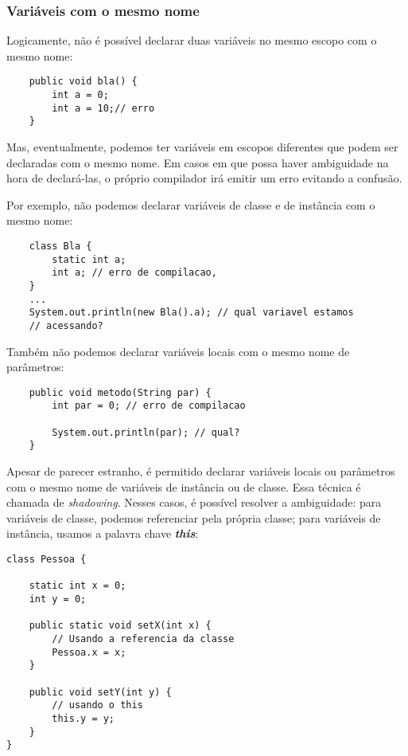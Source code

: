 \documentclass[12pt]{report}
\begin{document}
\subsubsection*{Variáveis com o mesmo nome}

Logicamente, não é possível declarar duas variáveis no mesmo escopo com o mesmo nome:

\begin{lstlisting}
	public void bla() {
		int a = 0;
		int a = 10;// erro
	}
\end{lstlisting}

Mas, eventualmente, podemos ter variáveis em escopos diferentes que podem ser declaradas com o mesmo nome. Em casos em que possa haver ambiguidade na hora de declará-las, o próprio compilador irá emitir um erro evitando a confusão.
\pagebreak

Por exemplo, não podemos declarar variáveis de classe e de instância com o mesmo nome:

\begin{lstlisting}
	class Bla {
		static int a;
		int a; // erro de compilacao,
	}
	...
	System.out.println(new Bla().a); // qual variavel estamos
	// acessando?
\end{lstlisting}

Também não podemos declarar variáveis locais com o mesmo nome de parâmetros:

\begin{lstlisting}
	public void metodo(String par) {
		int par = 0; // erro de compilacao
		
		System.out.println(par); // qual?
	}
\end{lstlisting}

Apesar de parecer estranho, é permitido declarar variáveis locais ou parâmetros com o mesmo nome de variáveis de instância ou de classe. Essa técnica é chamada de \textit{shadowing}. Nesses casos, é possível resolver a ambiguidade: para variáveis de classe, podemos referenciar pela própria classe; para variáveis de instância, usamos a palavra chave \textbf{\textit{this}}:

\begin{lstlisting}
class Pessoa {
	
	static int x = 0;
	int y = 0;
	
	public static void setX(int x) {
		// Usando a referencia da classe
		Pessoa.x = x;
	}
	
	public void setY(int y) {
		// usando o this
		this.y = y;
	}
}
\end{lstlisting}
\end{document}
